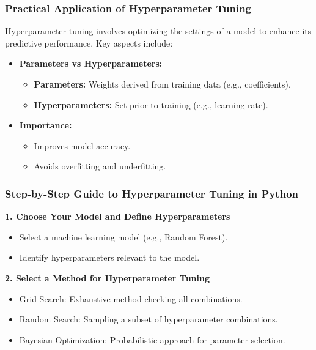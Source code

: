 \documentclass{beamer}
\begin{document}
\begin{frame}[fragile]
    \frametitle{Practical Application of Hyperparameter Tuning}
    Hyperparameter tuning involves optimizing the settings of a model to enhance its predictive performance. Key aspects include:
    \begin{itemize}
        \item \textbf{Parameters vs Hyperparameters:}
        \begin{itemize}
            \item \textbf{Parameters:} Weights derived from training data (e.g., coefficients).
            \item \textbf{Hyperparameters:} Set prior to training (e.g., learning rate).
        \end{itemize}
        \item \textbf{Importance:}
        \begin{itemize}
            \item Improves model accuracy.
            \item Avoids overfitting and underfitting.
        \end{itemize}
    \end{itemize}
\end{frame}

\begin{frame}[fragile]
    \frametitle{Step-by-Step Guide to Hyperparameter Tuning in Python}
    \textbf{1. Choose Your Model and Define Hyperparameters}
    \begin{itemize}
        \item Select a machine learning model (e.g., Random Forest).
        \item Identify hyperparameters relevant to the model.
    \end{itemize}
    
    \textbf{2. Select a Method for Hyperparameter Tuning}
    \begin{itemize}
        \item Grid Search: Exhaustive method checking all combinations.
        \item Random Search: Sampling a subset of hyperparameter combinations.
        \item Bayesian Optimization: Probabilistic approach for parameter selection.
    \end{itemize}
\end{frame}
\end{document}
